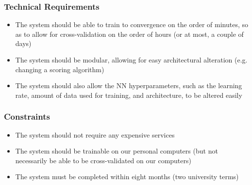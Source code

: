 \subsubsection{Technical Requirements}
\begin{itemize}
\item The system should be able to train to convergence on the order of minutes, so as to allow for cross-validation on the order of hours (or at most, a couple of days)
\item The system should be modular, allowing for easy architectural alteration (e.g. changing a scoring algorithm)
\item The system should also allow the NN hyperparameters, such as the learning rate, amount of data used for training, and architecture, to be altered easily
\end{itemize}

\subsubsection{Constraints}
\begin{itemize}
\item The system should not require any expensive services
\item The system should be trainable on our personal computers (but not necessarily be able to be cross-validated on our computers)
\item The system must be completed within eight months (two university terms)
\end{itemize}
